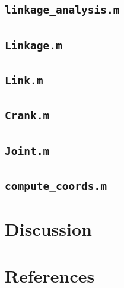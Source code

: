\documentclass[12pt]{article}
\begin{document}
\subsection{\texttt{linkage\_analysis.m}}%

\subsection{\texttt{Linkage.m}}%

\subsection{\texttt{Link.m}}%

\subsection{\texttt{Crank.m}}%

\subsection{\texttt{Joint.m}}%

\subsection{\texttt{compute\_coords.m}}%

\section{Discussion}%
\label{discuss}

\section{References}%
\label{ref}
\end{document}
